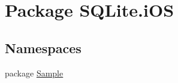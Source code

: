 \hypertarget{namespace_s_q_lite_1_1i_o_s}{\section{Package S\+Q\+Lite.\+i\+O\+S}
\label{namespace_s_q_lite_1_1i_o_s}
}
\subsection*{Namespaces}
\begin{DoxyCompactItemize}
\item 
package \hyperlink{namespace_s_q_lite_1_1i_o_s_1_1_sample}{Sample}
\end{DoxyCompactItemize}
